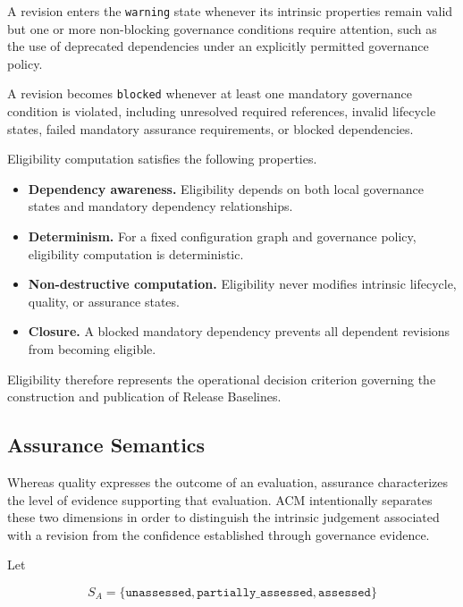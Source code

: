 \documentclass[10pt]{article}
\begin{document}
A revision enters the \texttt{warning} state whenever its intrinsic properties remain valid but one or more non-blocking governance conditions require attention, such as the use of deprecated dependencies under an explicitly permitted governance policy.

A revision becomes \texttt{blocked} whenever at least one mandatory governance condition is violated, including unresolved required references, invalid lifecycle states, failed mandatory assurance requirements, or blocked dependencies.

Eligibility computation satisfies the following properties.

\begin{itemize}

\item \textbf{Dependency awareness.}
Eligibility depends on both local governance states and mandatory dependency relationships.

\item \textbf{Determinism.}
For a fixed configuration graph and governance policy, eligibility computation is deterministic.

\item \textbf{Non-destructive computation.}
Eligibility never modifies intrinsic lifecycle, quality, or assurance states.

\item \textbf{Closure.}
A blocked mandatory dependency prevents all dependent revisions from becoming eligible.

\end{itemize}

Eligibility therefore represents the operational decision criterion governing the construction and publication of Release Baselines.

\subsection{Assurance Semantics}
\label{sec:assurance_semantics}

Whereas quality expresses the outcome of an evaluation, assurance characterizes the level of evidence supporting that evaluation. ACM intentionally separates these two dimensions in order to distinguish the intrinsic judgement associated with a revision from the confidence established through governance evidence.

Let

\[
S_A=
\{
\texttt{unassessed},
\texttt{partially\_assessed},
\texttt{assessed}
\}
\]
\end{document}
